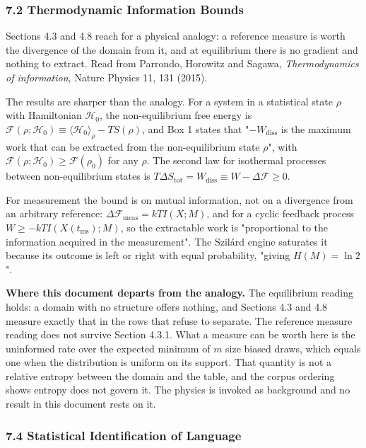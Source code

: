 \subsubsection{7.2 Thermodynamic Information Bounds}

Sections 4.3 and 4.8 reach for a physical analogy: a reference measure is worth the divergence of the domain from it, and at equilibrium there is no gradient and nothing to extract. Read from Parrondo, Horowitz and Sagawa, \emph{Thermodynamics of information}, Nature Physics 11, 131 (2015).

The results are sharper than the analogy. For a system in a statistical state \(\rho\) with Hamiltonian \(\mathcal{H}_0\), the non-equilibrium free energy is \(\mathcal{F}(\rho;\mathcal{H}_0) \equiv \langle \mathcal{H}_0\rangle_\rho - TS(\rho)\), and Box 1 states that "\(-W_{\text{diss}}\) is the maximum work that can be extracted from the non-equilibrium state \(\rho\)", with \(\mathcal{F}(\rho;\mathcal{H}_0) \ge \mathcal{F}(\rho_0)\) for any \(\rho\). The second law for isothermal processes between non-equilibrium states is \(T\Delta S_{\text{tot}} = W_{\text{diss}} \equiv W - \Delta\mathcal{F} \ge 0\).

For measurement the bound is on mutual information, not on a divergence from an arbitrary reference: \(\Delta \mathcal{F}_{\text{meas}} = kTI(X;M)\), and for a cyclic feedback process \(W \ge -kTI(X(t_{\text{ms}});M)\), so the extractable work is "proportional to the information acquired in the measurement". The Szilárd engine saturates it because its outcome is left or right with equal probability, "giving \(H(M) = \ln 2\)".

\noindent\textbf{Where this document departs from the analogy.} The equilibrium reading holds: a domain with no structure offers nothing, and Sections 4.3 and 4.8 measure exactly that in the rows that refuse to separate. The reference measure reading does not survive Section 4.3.1. What a measure can be worth here is the uninformed rate over the expected minimum of \(m\) size biased draws, which equals one when the distribution is uniform on its support. That quantity is not a relative entropy between the domain and the table, and the corpus ordering shows entropy does not govern it. The physics is invoked as background and no result in this document rests on it.

\subsubsection{7.4 Statistical Identification of Language}

